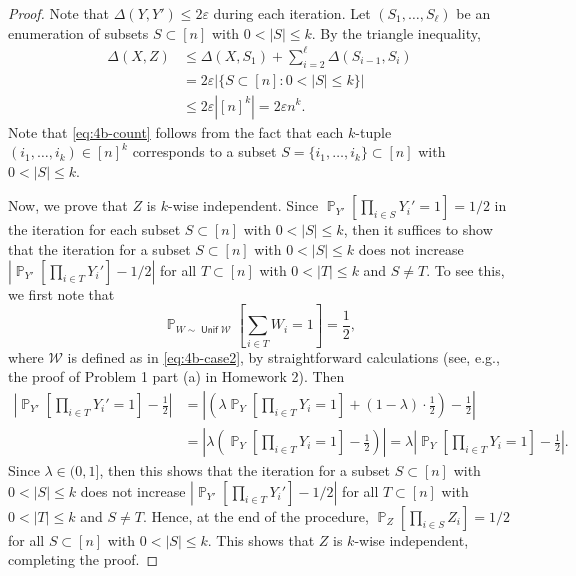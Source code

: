 \documentclass[letterpaper, reqno,11pt]{article}
\newcommand{\PP}{\mathop{{}\mathbb{P}}}
\DeclareMathOperator{\Unif}{\mathsf{Unif}}
\begin{document}
\begin{enumerate}
\begin{enumerate}
\begin{proof}
      Note that $\Delta(Y, Y') \leq 2\varepsilon$ during each iteration. Let $(S_1, \ldots, S_\ell)$ be an enumeration of subsets $S \subset [n]$ with $0 < |S| \leq k$. By the triangle inequality,
      \begin{align}
        \Delta(X, Z) &\leq \Delta\left(X, S_1\right) + \sum_{i = 2}^\ell \Delta\left(S_{i - 1}, S_i\right) \nonumber \\
        &= 2\varepsilon |\{ S \subset [n] : 0 < |S| \leq k \}| \nonumber \\
        &\leq 2\varepsilon \left|[n]^k\right| = 2\varepsilon n^k. \label{eq:4b-count}
      \end{align}
      Note that \eqref{eq:4b-count} follows from the fact that each $k$-tuple $(i_1, \ldots, i_k) \in [n]^k$ corresponds to a subset $S = \{ i_1, \ldots, i_k \} \subset [n]$ with $0 < |S| \leq k$.

      Now, we prove that $Z$ is $k$-wise independent. Since $\PP_{Y'}[\prod_{i \in S} Y_i' = 1] = 1/2$ in the iteration for each subset $S \subset [n]$ with $0 < |S| \leq k$, then it suffices to show that the iteration for a subset $S \subset [n]$ with $0 < |S| \leq k$ does not increase $|\PP_{Y'}[\prod_{i \in T} Y_i'] - 1/2|$ for all $T \subset [n]$ with $0 < |T| \leq k$ and $S \neq T$. To see this, we first note that
      $$ \PP_{W \sim \Unif \mathcal W}\left[\sum_{i \in T} W_i = 1\right] = \frac{1}{2}, $$
      where $\mathcal W$ is defined as in \eqref{eq:4b-case2}, by straightforward calculations (see, e.g., the proof of Problem 1 part (a) in Homework 2). Then
      \begin{align*}
        \left|\PP_{Y'}\left[\prod_{i \in T} Y_i' = 1\right] - \frac{1}{2}\right| &= \left|\left(\lambda\PP_Y\left[\prod_{i \in T} Y_i = 1\right] + (1 - \lambda) \cdot \frac{1}{2}\right) - \frac{1}{2}\right| \\
        &= \left|\lambda\left(\PP_Y\left[\prod_{i \in T} Y_i = 1\right] - \frac{1}{2}\right)\right| = \lambda \left|\PP_Y\left[\prod_{i \in T} Y_i = 1\right] - \frac{1}{2}\right|.
      \end{align*}
      Since $\lambda \in (0, 1]$, then this shows that the iteration for a subset $S \subset [n]$ with $0 < |S| \leq k$ does not increase $|\PP_{Y'}[\prod_{i \in T} Y_i'] - 1/2|$ for all $T \subset [n]$ with $0 < |T| \leq k$ and $S \neq T$. Hence, at the end of the procedure, $\PP_Z[\prod_{i \in S} Z_i] = 1/2$ for all $S \subset [n]$ with $0 < |S| \leq k$. This shows that $Z$ is $k$-wise independent, completing the proof.
    \end{proof}
  \end{enumerate}
\end{enumerate}
\end{document}
